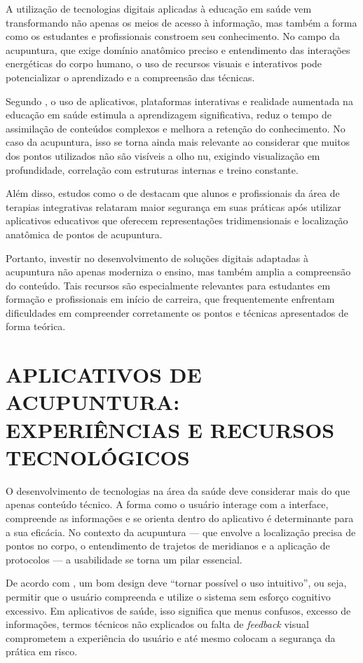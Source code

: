 A utilização de tecnologias digitais aplicadas à educação em saúde vem transformando não apenas os meios de acesso à informação, mas também a forma como os estudantes e profissionais constroem seu conhecimento. No campo da acupuntura, que exige domínio anatômico preciso e entendimento das interações energéticas do corpo humano, o uso de recursos visuais e interativos pode potencializar o aprendizado e a compreensão das técnicas.

Segundo , o uso de aplicativos, plataformas interativas e realidade aumentada na educação em saúde estimula a aprendizagem significativa, reduz o tempo de assimilação de conteúdos complexos e melhora a retenção do conhecimento. No caso da acupuntura, isso se torna ainda mais relevante ao considerar que muitos dos pontos utilizados não são visíveis a olho nu, exigindo visualização em profundidade, correlação com estruturas internas e treino constante.

Além disso, estudos como o de  destacam que alunos e profissionais da área de terapias integrativas relataram maior segurança em suas práticas após utilizar aplicativos educativos que oferecem representações tridimensionais e localização anatômica de pontos de acupuntura.

Portanto, investir no desenvolvimento de soluções digitais adaptadas à acupuntura não apenas moderniza o ensino, mas também amplia a compreensão do conteúdo. Tais recursos são especialmente relevantes para estudantes em formação e profissionais em início de carreira, que frequentemente enfrentam dificuldades em compreender corretamente os pontos e técnicas apresentados de forma teórica.

\section{APLICATIVOS DE ACUPUNTURA: EXPERIÊNCIAS E RECURSOS TECNOLÓGICOS} \label{sec:aplicativos_acupuntura}

O desenvolvimento de tecnologias na área da saúde deve considerar mais do que apenas conteúdo técnico. A forma como o usuário interage com a interface, compreende as informações e se orienta dentro do aplicativo é determinante para a sua eficácia. No contexto da acupuntura --- que envolve a localização precisa de pontos no corpo, o entendimento de trajetos de meridianos e a aplicação de protocolos --- a usabilidade se torna um pilar essencial.

De acordo com , um bom design deve ``tornar possível o uso intuitivo'', ou seja, permitir que o usuário compreenda e utilize o sistema sem esforço cognitivo excessivo. Em aplicativos de saúde, isso significa que menus confusos, excesso de informações, termos técnicos não explicados ou falta de \textit{feedback} visual comprometem a experiência do usuário e até mesmo colocam a segurança da prática em risco.

